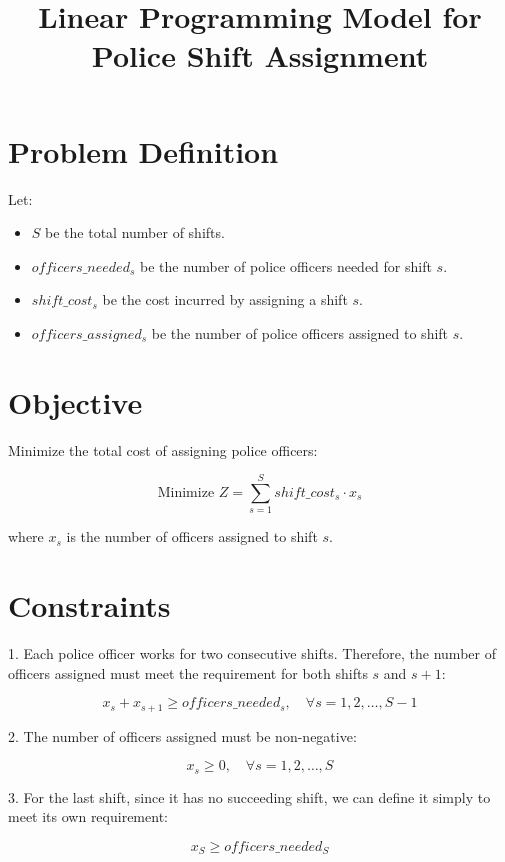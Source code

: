 \documentclass{article}
\begin{document}
\title{Linear Programming Model for Police Shift Assignment}
\author{}
\date{}
\maketitle

\section*{Problem Definition}

Let:
\begin{itemize}
    \item \( S \) be the total number of shifts.
    \item \( officers\_needed_{s} \) be the number of police officers needed for shift \( s \).
    \item \( shift\_cost_{s} \) be the cost incurred by assigning a shift \( s \).
    \item \( officers\_assigned_{s} \) be the number of police officers assigned to shift \( s \).
\end{itemize}

\section*{Objective}

Minimize the total cost of assigning police officers:

\[
\text{Minimize } Z = \sum_{s=1}^{S} shift\_cost_{s} \cdot x_s
\]

where \( x_s \) is the number of officers assigned to shift \( s \).

\section*{Constraints}

1. Each police officer works for two consecutive shifts. Therefore, the number of officers assigned must meet the requirement for both shifts \( s \) and \( s+1 \):

\[
x_s + x_{s+1} \geq officers\_needed_{s}, \quad \forall s = 1, 2, \ldots, S-1
\]

2. The number of officers assigned must be non-negative:

\[
x_s \geq 0, \quad \forall s = 1, 2, \ldots, S
\]

3. For the last shift, since it has no succeeding shift, we can define it simply to meet its own requirement:

\[
x_S \geq officers\_needed_{S}
\]
\end{document}
